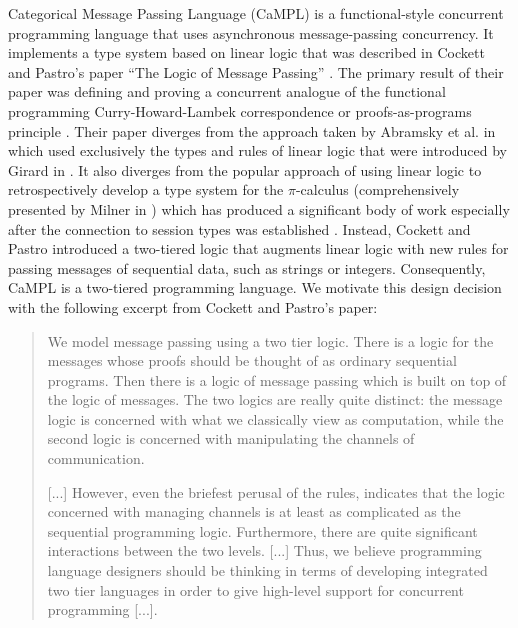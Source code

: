 \documentclass[11pt]{article}
\begin{document}
Categorical Message Passing Language (CaMPL) is a functional-style concurrent programming language that uses asynchronous message-passing concurrency.
It implements a type system based on linear logic that was described in Cockett and Pastro’s paper ``The Logic of Message Passing'' \cite{CoP07}. The primary result of their paper was defining and proving a concurrent analogue of the functional programming Curry-Howard-Lambek correspondence or proofs-as-programs principle \cite{Howard1980, Lambek1969, Lambek1972}. 
Their paper diverges from the approach taken by Abramsky et al. in 
\cite{ABRAMSKY19933, Abr1993IntCats, Abramsky1999ConcurrentGA, AGN2000} which used exclusively the types and rules of linear logic that were introduced by Girard in \cite{GIRARD19871}.
It also diverges from the popular approach of using linear logic to retrospectively develop a type system for the \(\pi\)-calculus (comprehensively presented by Milner in \cite{Milner1993TheP}) which has produced a significant body of work especially after the connection to session types was established \cite{Honda1993TypesFD, BELLIN199411, Kob96, Barber1997Action, CPf2010, Wa12, CairesPT16, KMP19, AG19, QKB21}.
%
Instead, Cockett and Pastro introduced a two-tiered logic that augments linear logic with new rules for passing messages of sequential data, such as strings or integers.
Consequently, CaMPL is a two-tiered programming language.
We motivate this design decision with the following excerpt from Cockett and Pastro’s paper: 
\begin{quote}
We model message passing using a two tier logic. There is a logic for the messages whose proofs should be thought of as ordinary sequential programs.
Then there is a logic of message passing which is built on top of the logic of messages. The two logics are really quite distinct: the message logic is concerned with what we classically view as computation, while the second logic is concerned with manipulating the channels of communication.

[...] However, even the briefest perusal of the rules, indicates that the logic concerned with managing channels is at least as complicated as the sequential programming logic. Furthermore, there are quite significant
interactions between the two levels. 
[...]
 Thus, we believe programming language designers should be thinking in terms of developing integrated two tier languages in order to give high-level support for concurrent programming [...]. 
\end{quote}
\end{document}
